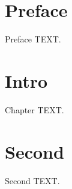 \documentclass{svmult}
\begin{document}
\chapter*{Preface}
Preface TEXT.
\chapter{Intro}
Chapter TEXT.
\chapter{Second}
Second TEXT.
\end{document}
